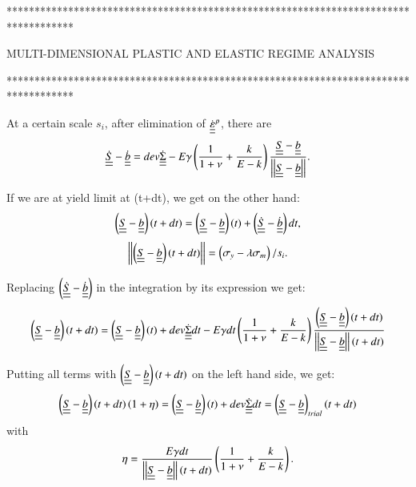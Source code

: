 \clearpage
************************************************************************************

MULTI-DIMENSIONAL PLASTIC AND ELASTIC REGIME ANALYSIS

************************************************************************************

At a certain scale $s_i$, after elimination of $ \dot{\uline{\uline{\varepsilon}}}^p$, there are 
$$\dot{\uline{\uline{S}}}- \dot{\uline{\uline{b}}}= dev\dot{\uline{\uline{\Sigma}}}-E\gamma\left( \dfrac{1}{1+\nu}+\dfrac{k}{E-k}\right)\dfrac{\uline{\uline{S}}-\uline{\uline{b}}}{\left| \left|\uline{\uline{S}}-\uline{\uline{b}}\right| \right|}. $$

If we are at yield limit at (t+dt), we get on the other hand:
$$\left( \uline{\uline{S}}-\uline{\uline{b}}\right) (t+dt)=\left( \uline{\uline{S}}-\uline{\uline{b}}\right) (t)+\left( \dot{\uline{\uline{S}}}- \dot{\uline{\uline{b}}}\right) dt,$$
\begin{equation}\left| \left| \left( \uline{\uline{S}}-\uline{\uline{b}}\right) (t+dt)\right| \right| =\left( \sigma_y-\lambda \sigma_m\right)/s_i .
\end{equation}

Replacing $\left( \dot{\uline{\uline{S}}}-\dot{\uline{\uline{b}}}\right) $ in the integration by its expression we get:
\begin{equation}
\left( \uline{\uline{S}}-\uline{\uline{b}}\right) (t+dt)=\left( \uline{\uline{S}}-\uline{\uline{b}}\right) (t)+dev\dot{\uline{\uline{\Sigma}}}dt-E\gamma dt\left(\dfrac{1}{1+\nu}+\dfrac{k}{E-k} \right) \dfrac{\left( \uline{\uline{S}}-\uline{\uline{b}}\right) (t+dt)}{\left| \left|\uline{\uline{S}}-\uline{\uline{b}}\right| \right| (t+dt)}
\end{equation}

Putting all terms with $ \left( \uline{\uline{S}}-\uline{\uline{b}}\right) (t+dt)$ on the left hand side, we get:
\begin{equation}
\left( \uline{\uline{S}}-\uline{\uline{b}}\right) (t+dt)\left(  1+\eta\right) =\left( \uline{\uline{S}}-\uline{\uline{b}}\right) (t)+dev\dot{\uline{\uline{\Sigma}}}dt=\left( \uline{\uline{S}}-\uline{\uline{b}}\right)_{trial} (t+dt)
\label{eqyield}
\end{equation}
with\begin{equation}\eta=\dfrac{E\gamma dt}{\left| \left|\uline{\uline{S}}-\uline{\uline{b}}\right| \right|(t+dt)}\left(\dfrac{1}{1+\nu}+\dfrac{k}{E-k} \right).
\label{eta}
\end{equation}

